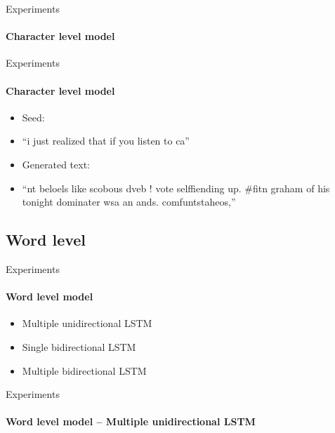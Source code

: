 \documentclass{beamer}
\begin{document}
\begin{frame}{Experiments}
\framesubtitle{Character level model}
\end{frame}

\begin{frame}{Experiments}
\framesubtitle{Character level model}
\begin{itemize}
\item Seed:
\item[] ``i just realized that if you listen to ca''
\vspace{5mm}
\item Generated text:
\item[] ``nt beloels like scobous dveb ! vote selffiending up. \#fitn graham of his tonight dominater wsa an ands. comfuntstaheos,''
\end{itemize}
\end{frame}

\subsection{Word level}

\begin{frame}{Experiments}
\framesubtitle{Word level model}
\begin{itemize}
\item Multiple unidirectional LSTM
\vspace{3mm}
\item Single bidirectional LSTM
\vspace{3mm}
\item Multiple bidirectional LSTM
\end{itemize}
\end{frame}

\begin{frame}{Experiments}
\framesubtitle{Word level model -- Multiple unidirectional LSTM}
\end{frame}
\end{document}
